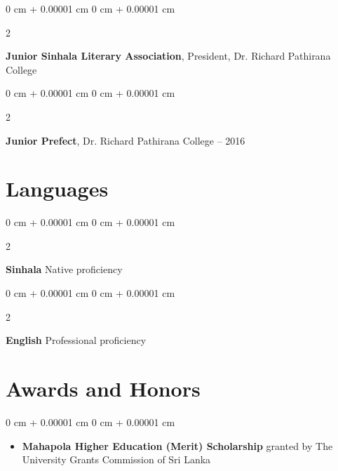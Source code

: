 \documentclass[10pt, letterpaper]{article}
\newenvironment{highlights}{
    \begin{itemize}[
        topsep=0.10 cm,
        parsep=0.10 cm,
        partopsep=0pt,
        itemsep=0pt,
        leftmargin=0 cm + 10pt
    ]
}{
    \end{itemize}
} %
\newenvironment{onecolentry}{
    \begin{adjustwidth}{
        0 cm + 0.00001 cm
    }{
        0 cm + 0.00001 cm
    }
}{
    \end{adjustwidth}
} %
\newenvironment{twocolentry}[2][]{
    \onecolentry
    \def\secondColumn{#2}
    \setcolumnwidth{\fill, 4.5 cm}
    \begin{paracol}{2}
}{
    \switchcolumn \raggedleft \secondColumn
    \end{paracol}
    \endonecolentry
} %
\begin{document}
        \vspace{0.30 cm}
        \begin{twocolentry}{
            2015
        }
            \textbf{Junior Sinhala Literary Association}, President, Dr. Richard Pathirana College\end{twocolentry}

        \vspace{0.30 cm}
        \begin{twocolentry}{
            2015 – 2016
        }
            \textbf{Junior Prefect}, Dr. Richard Pathirana College\end{twocolentry}

    \section{Languages}
        
        \begin{twocolentry}{
            Native proficiency
        }
            \textbf{Sinhala}\end{twocolentry}

        \vspace{0.30 cm}
        \begin{twocolentry}{
            Professional proficiency
        }
            \textbf{English}\end{twocolentry}

    \section{Awards and Honors}
        
        \begin{onecolentry}
            \begin{highlights}
                \item \textbf{Mahapola Higher Education (Merit) Scholarship} granted by The University Grants Commission of Sri Lanka
            \end{highlights}
        \end{onecolentry}
\end{document}
